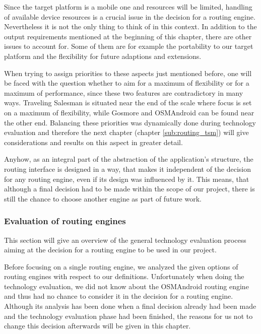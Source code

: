 Since the target platform is a mobile one and resources will be limited, handling of available device resources is a crucial issue in the decision for a routing engine. Nevertheless it is not the only thing to think of in this context. In addition to the output requirements mentioned at the beginning of this chapter, there are other issues to account for. Some of them are for example the portability to our target platform and the flexibility for future adaptions and extensions.\newline

When trying to assign priorities to these aspects just mentioned before, one will be faced with the question whether to aim for a maximum of flexibility or for a maximum of performance, since these two features are contradictory in many ways. Traveling Salesman is situated near the end of the scale where focus is set on a maximum of flexibility, while Gosmore and OSMAndroid can be found near the other end. Balancing these priorities was dynamically done during technology evaluation and therefore the next chapter (chapter \ref{sub:routing_tsm}) will give considerations and results on this aspect in greater detail.\newline

Anyhow, as an integral part of the abstraction of the application's structure, the routing interface is designed in a way, that makes it independent of the decision for any routing engine, even if its design was influenced by it. This means, that although a final decision had to be made within the scope of our project, there is still the chance to choose another engine as part of future work.

\subsubsection{Evaluation of routing engines}

This section will give an overview of the general technology evaluation process aiming at the decision for a routing engine to be used in our project.\newline

Before focusing on a single routing engine, we analyzed the given options of routing engines with respect to our definitions. Unfortunately when doing the technology evaluation, we did not know about the OSMAndroid routing engine and thus had no chance to consider it in the decision for a routing engine. Although its analysis has been done when a final decision already had been made and the technology evaluation phase had been finished, the reasons for us not to change this decision afterwards will be given in this chapter.\newline

